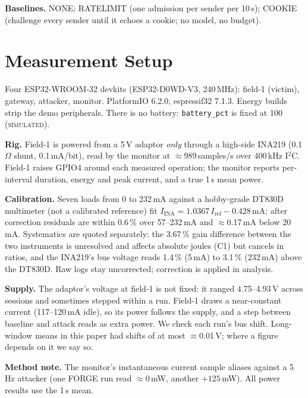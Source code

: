 \documentclass[conference]{IEEEtran}
\newcommand{\simu}{\textsc{simulated}}
\begin{document}
\textbf{Baselines.} NONE; RATELIMIT (one admission per sender per 10\,s); COOKIE (challenge every sender until it
echoes a cookie; no model, no budget).

\section{Measurement Setup}\label{sec:setup}
Four ESP32-WROOM-32 devkits (ESP32-D0WD-V3, 240\,MHz): field-1 (victim), gateway, attacker, monitor. PlatformIO
6.2.0, espressif32 7.1.3. Energy builds strip the demo peripherals. There is no battery: \texttt{battery\_pct} is
fixed at 100 (\simu).

\textbf{Rig.} Field-1 is powered from a 5\,V adaptor \emph{only} through a high-side INA219 (0.1\,$\Omega$ shunt,
0.1\,mA/bit), read by the monitor at $\approx$989\,samples/s over 400\,kHz I$^2$C. Field-1 raises GPIO4 around each
measured operation; the monitor reports per-interval duration, energy and peak current, and a true 1\,s mean power.

\textbf{Calibration.} Seven loads from 0 to 232\,mA against a hobby-grade DT830D multimeter (not a calibrated
reference) fit $I_{\mathrm{INA}}=1.0367\,I_{\mathrm{ref}}-0.428$\,mA; after correction residuals are within
0.6\,\% over 57--232\,mA and $\approx$0.17\,mA below 20\,mA. Systematics are quoted separately: the 3.67\,\% gain
difference between the two instruments is unresolved and affects absolute joules (C1) but cancels in ratios, and
the INA219's bus voltage reads 1.4\,\% (5\,mA) to 3.1\,\% (232\,mA) above the DT830D. Raw logs stay uncorrected;
correction is applied in analysis.

\textbf{Supply.} The adaptor's voltage at field-1 is not fixed: it ranged 4.75--4.93\,V across sessions and
sometimes stepped within a run. Field-1 draws a near-constant current (117--120\,mA idle), so its power follows the
supply, and a step between baseline and attack reads as extra power. We check each run's bus shift. Long-window
means in this paper had shifts of at most $\approx$0.01\,V; where a figure depends on it we say so.

\textbf{Method note.} The monitor's instantaneous current sample aliases against a 5\,Hz attacker (one FORGE run read
$\approx$0\,mW, another $+125$\,mW). All power results use the 1\,s mean.
\end{document}
